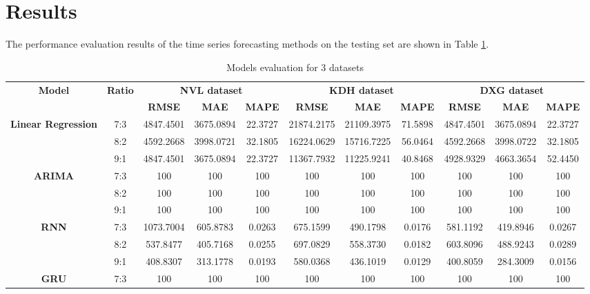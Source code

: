 \documentclass[conference]{IEEEtran}
\begin{document}
\section{Results}
The performance evaluation results of the time series forecasting methods on the testing set are shown in Table \ref{tb_evaluation}.
\FloatBarrier
\begin{table}
    \centering
    \caption{Models evaluation for 3 datasets}
    \label{tb_evaluation}
    \begin{tabular}{|c|c|c|c|c|c|c|c|c|c|c|}
        \hline
        \multirow{2}{*}{\textbf{Model}} & \multirow{2}{*}{\textbf{Ratio}} & \multicolumn{3}{c|}{\textbf{NVL dataset}} & \multicolumn{3}{c|}{\textbf{KDH dataset}} & \multicolumn{3}{c|}{\textbf{DXG dataset}} \\ \cline{3-11}
        & & \textbf{RMSE} & \textbf{MAE} & \textbf{MAPE} & \textbf{RMSE} & \textbf{MAE} & \textbf{MAPE} & \textbf{RMSE} & \textbf{MAE} & \textbf{MAPE}\\ \hline
        \multirow{3}{*}{\textbf{Linear Regression}} 
            & 7:3 & 4847.4501 & 3675.0894 & 22.3727 & 21874.2175 & 21109.3975 & 71.5898 & 4847.4501 & 3675.0894 & 22.3727 \\ 
            & 8:2 & 4592.2668 & 3998.0721 & 32.1805 & 16224.0629 & 15716.7225 & 56.0464 & 4592.2668 & 3998.0722 & 32.1805 \\ 
            & 9:1 & 4847.4501 & 3675.0894 & 22.3727 & 11367.7932 & 11225.9241 & 40.8468 & 4928.9329 & 4663.3654 & 52.4450 \\ \hline
        \multirow{3}{*}{\textbf{ARIMA}} 
            & 7:3 & 100 & 100 & 100 & 100 & 100 & 100 & 100 & 100 & 100 \\
            & 8:2 & 100 & 100 & 100 & 100 & 100 & 100 & 100 & 100 & 100 \\
            & 9:1 & 100 & 100 & 100 & 100 & 100 & 100 & 100 & 100 & 100 \\ \hline
        \multirow{3}{*}{\textbf{RNN}} 
            & 7:3 & 1073.7004 & 605.8783 & 0.0263 & 675.1599 & 490.1798 & 0.0176 & 581.1192 & 419.8946 & 0.0267 \\
            & 8:2 & 537.8477 & 405.7168 & 0.0255 & 697.0829 & 558.3730 & 0.0182 & 603.8096 & 488.9243 & 0.0289 \\
            & 9:1 & 408.8307 & 313.1778 & 0.0193 & 580.0368 & 436.1019 & 0.0129 & 400.8059 & 284.3009 & 0.0156 \\ \hline
        \multirow{3}{*}{\textbf{GRU}} 
            & 7:3 & 100 & 100 & 100 & 100 & 100 & 100 & 100 & 100 & 100 \\

\end{tabular}
\end{table}
\end{document}
